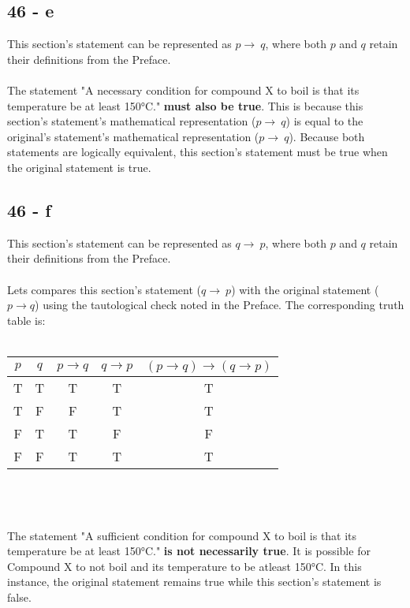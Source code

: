 \documentclass[12pt]{article}
\begin{document}
\subsection*{46 - e}
This section's statement can be represented as $p \rightarrow \ q$, where both $p$ and $q$ retain their definitions from the Preface.
\\ \\
The statement "A necessary condition for compound X to boil is that its temperature be at least 150°C." \textbf{must also be true}. This is because this section's statement's mathematical representation ($p \rightarrow \ q$) is equal to the original's statement's mathematical representation ($p \rightarrow \ q$). Because both statements are logically equivalent, this section's statement must be true when the original statement is true.

\subsection*{46 - f}
This section's statement can be represented as $q \rightarrow \ p$, where both $p$ and $q$ retain their definitions from the Preface.
\\ \\
Lets compares this section's statement ($q \rightarrow \ p$) with the original statement ($p \rightarrow q$) using the tautological check noted in the Preface. The corresponding truth table is:  \\ \\
\begin{tabular}{c c|c c|c}
  $p$ & $q$ 
  & $p \rightarrow q$ & $q \rightarrow p$
  & $(p \rightarrow q) \rightarrow (q \rightarrow p)$\\
  \hline
  T&T&T&T&T \\
  T&F&F&T&T \\
  F&T&T&F&F \\
  F&F&T&T&T \\
\end{tabular}
\\ \\ \\
The statement "A sufficient condition for compound X to boil is that its temperature be at least 150°C." \textbf{is not necessarily true}. It is possible for Compound X to not boil and its temperature to be atleast 150°C. In this instance, the original statement remains true while this section's statement is false.
\end{document}
